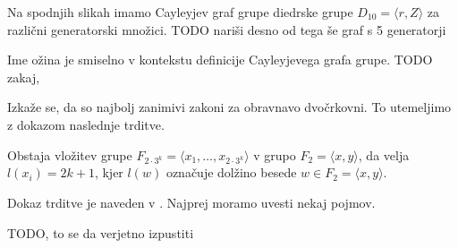 \documentclass[mat1, tisk]{fmfdelo}
\begin{document}
\begin{primer}
Na spodnjih slikah imamo Cayleyjev graf grupe diedrske grupe $D_{10} = \langle r, Z \rangle$ za različni generatorski množici.
TODO nariši desno od tega še graf s 5 generatorji
\begin{center}
    \end{center}
\end{primer}


\begin{opomba}
Ime ožina je smiselno v kontekstu definicije Cayleyjevega grafa grupe. TODO zakaj, 
\end{opomba}


Izkaže se, da so najbolj zanimivi zakoni za obravnavo dvočrkovni. To utemeljimo z dokazom naslednje trditve.

\begin{trditev}
\label{trd_vlozitev_proste_grupe}
 Obstaja vložitev grupe $F_{2 \cdot 3^{k}} = \langle x_1, \ldots, x_{2 \cdot 3^{k}} \rangle$ v grupo $F_2 = \langle x,y \rangle $, da velja $l(x_i) = 2k + 1$, kjer $l(w)$ označuje dolžino besede $w \in F_2 = \langle x,y \rangle$. 
\end{trditev}

\noindent
Dokaz trditve je naveden v \cite{Schneider_2016}. Najprej moramo uvesti nekaj pojmov. 

\begin{definicija}
\label{def_schreierjev_graf}
TODO, to se da verjetno izpustiti
\end{definicija}
\end{document}
